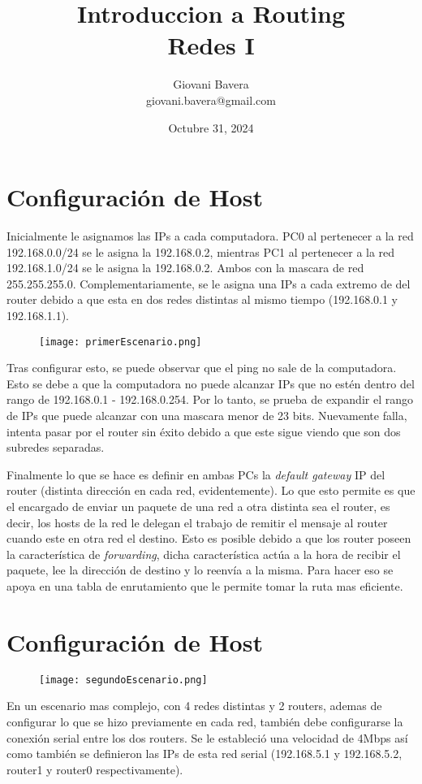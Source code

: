 \documentclass{article}
\title{Introduccion a Routing \\ Redes I}
\author{Giovani Bavera \\ giovani.bavera@gmail.com}
\date{Octubre 31, 2024}
\begin{document}
\maketitle

\section{Configuración de Host}
Inicialmente le asignamos las IPs a cada computadora. PC0 al pertenecer a la red 192.168.0.0/24 se le asigna la 192.168.0.2, mientras PC1 al pertenecer a la red 192.168.1.0/24 se le asigna la 192.168.0.2. Ambos con la mascara de red 255.255.255.0. Complementariamente, se le asigna una IPs a cada extremo de del router debido a que esta en dos redes distintas al mismo tiempo (192.168.0.1 y 192.168.1.1). 

\begin{figure} [h]
    \centering
    \texttt{[image: primerEscenario.png]}
    \label{fig:enter-label}
\end{figure}

Tras configurar esto, se puede observar que el ping no sale de la computadora. Esto se debe a que la computadora no puede alcanzar IPs que no estén dentro del rango de 192.168.0.1 - 192.168.0.254. Por lo tanto, se prueba de expandir el rango de IPs que puede alcanzar con una mascara menor de 23 bits. Nuevamente falla, intenta pasar por el router sin éxito debido a que este sigue viendo que son dos subredes separadas. 

Finalmente lo que se hace es definir en ambas PCs la \textit{default gateway} IP del router (distinta dirección en cada red, evidentemente). Lo que esto permite es que el encargado de enviar un paquete de una red a otra distinta sea el router, es decir, los hosts de la red le delegan el trabajo de remitir el mensaje al router cuando este en otra red el destino. Esto es posible debido a que los router poseen la característica de \textit{forwarding}, dicha característica actúa a la hora de recibir el paquete, lee la dirección de destino y lo reenvía a la misma. Para hacer eso se apoya en una tabla de enrutamiento que le permite tomar la ruta mas eficiente. 

\section{Configuración de Host}

\begin{figure} [h]
    \centering
    \texttt{[image: segundoEscenario.png]}
    \label{fig:enter-label}
\end{figure}
En un escenario mas complejo, con 4 redes distintas y 2 routers, ademas de configurar lo que se hizo previamente en cada red, también debe configurarse la conexión serial entre los dos routers. Se le estableció una velocidad de 4Mbps así como también se definieron las IPs de esta red serial (192.168.5.1 y 192.168.5.2, router1 y router0 respectivamente). 
\end{document}

